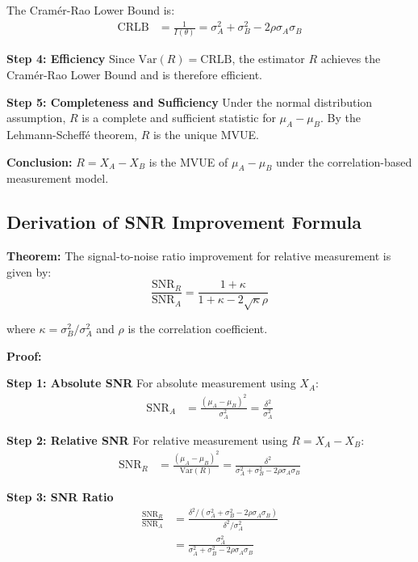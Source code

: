 The Cramér-Rao Lower Bound is:
\begin{align}
\text{CRLB} &= \frac{1}{I(\theta)} = \sigma_A^2 + \sigma_B^2 - 2\rho\sigma_A\sigma_B
\end{align}

\textbf{Step 4: Efficiency}
Since $\text{Var}(R) = \text{CRLB}$, the estimator $R$ achieves the Cramér-Rao Lower Bound and is therefore efficient.

\textbf{Step 5: Completeness and Sufficiency}
Under the normal distribution assumption, $R$ is a complete and sufficient statistic for $\mu_A - \mu_B$. By the Lehmann-Scheffé theorem, $R$ is the unique MVUE.

\textbf{Conclusion:} $R = X_A - X_B$ is the MVUE of $\mu_A - \mu_B$ under the correlation-based measurement model.

\subsection{Derivation of SNR Improvement Formula}

\textbf{Theorem:} The signal-to-noise ratio improvement for relative measurement is given by:
\begin{equation}
\frac{\text{SNR}_R}{\text{SNR}_A} = \frac{1 + \kappa}{1 + \kappa - 2\sqrt{\kappa}\rho}
\end{equation}

where $\kappa = \sigma_B^2/\sigma_A^2$ and $\rho$ is the correlation coefficient.

\textbf{Proof:}

\textbf{Step 1: Absolute SNR}
For absolute measurement using $X_A$:
\begin{align}
\text{SNR}_A &= \frac{(\mu_A - \mu_B)^2}{\sigma_A^2} = \frac{\delta^2}{\sigma_A^2}
\end{align}

\textbf{Step 2: Relative SNR}
For relative measurement using $R = X_A - X_B$:
\begin{align}
\text{SNR}_R &= \frac{(\mu_A - \mu_B)^2}{\text{Var}(R)} = \frac{\delta^2}{\sigma_A^2 + \sigma_B^2 - 2\rho\sigma_A\sigma_B}
\end{align}

\textbf{Step 3: SNR Ratio}
\begin{align}
\frac{\text{SNR}_R}{\text{SNR}_A} &= \frac{\delta^2/(\sigma_A^2 + \sigma_B^2 - 2\rho\sigma_A\sigma_B)}{\delta^2/\sigma_A^2} \\
&= \frac{\sigma_A^2}{\sigma_A^2 + \sigma_B^2 - 2\rho\sigma_A\sigma_B}
\end{align}

